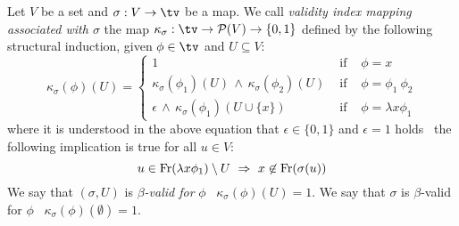 \begin{defin}\label{logic:def:LAM:beta:valid:index}
    Let $V$ be a set and $\sigma:V\to\tv$ be a map. We call {\em validity
    index mapping associated with $\sigma$} the map $\kappa_{\sigma}:\tv
    \to{\cal P}(V)\to\{0,1\}$ defined by the following structural induction,
    given $\phi\in\tv$ and $U\subseteq V$:
        \begin{equation}\label{logic:eqn:LAM:index}
            \kappa_{\sigma}(\phi)(U)=\left\{
                \begin{array}{lcl}
                    1&\mbox{\ if\ }&\phi=x\\
                    \kappa_{\sigma}(\phi_{1})(U)\,\land\,
                    \kappa_{\sigma}(\phi_{2})(U)
                    &\mbox{\ if\ }&\phi=\phi_{1}\ \phi_{2}\\
                    \epsilon\,\land\,\kappa_{\sigma}(\phi_{1})(U\cup\{x\})
                    &\mbox{\ if\ }&\phi=\lambda x\phi_{1}
            \end{array}\right.
        \end{equation} 
    where it is understood in the above equation that $\epsilon\in\{0,1\}$ 
    and $\epsilon=1$ holds \ifand\ the following implication is true 
    for all $u\in V$:
        \[
            u\in\free(\lambda x\phi_{1})\setminus U
                \ \Rightarrow\ 
            x\not\in\free(\sigma(u))
        \]
    We say that $(\sigma,U)$ is {\em $\beta$-valid for} $\phi$ \ifand\ 
    $\kappa_{\sigma}(\phi)(U)=1$. \newline
    We say that $\sigma$ is $\beta$-valid for $\phi$ \ifand\
    $\kappa_{\sigma}(\phi)(\emptyset)=1$.
\end{defin}


